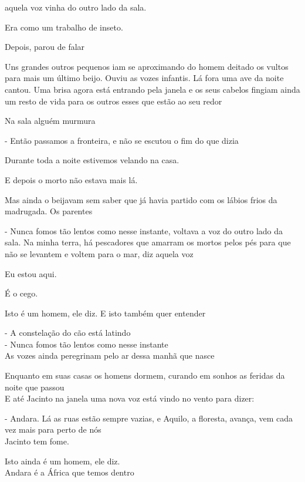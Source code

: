 aquela voz vinha do outro lado da sala.

Era como um trabalho de inseto.

Depois, parou de falar

Uns grandes outros pequenos iam se aproximando do homem deitado os
vultos para mais um último beijo. Ouviu as vozes infantis. Lá fora uma
ave da noite cantou. Uma brisa agora está entrando pela janela e os seus
cabelos fingiam ainda um resto de vida para os outros esses que estão ao
seu redor

Na sala alguém murmura

- Então passamos a fronteira, e não se escutou o fim do que dizia

Durante toda a noite estivemos velando na casa.

E depois o morto não estava mais lá.

Mas ainda o beijavam sem saber que já havia partido com os lábios frios
da madrugada. Os parentes

- Nunca fomos tão lentos como nesse instante, voltava a voz do outro
lado da sala. Na minha terra, há pescadores que amarram os mortos pelos
pés para que não se levantem e voltem para o mar, diz aquela voz

\pagebreak

Eu estou aqui.

É o cego.

Isto é um homem, ele diz. E isto também quer entender

\pagebreak

- A constelação do cão está latindo\\

- Nunca fomos tão lentos como nesse instante\\

As vozes ainda peregrinam pelo ar dessa manhã que nasce

Enquanto em suas casas os homens dormem, curando em sonhos as feridas da
noite que passou\\

E até Jacinto na janela uma nova voz está vindo no vento para dizer:

- Andara. Lá as ruas estão sempre vazias, e Aquilo, a floresta, avança,
vem cada vez mais para perto de nós\\

Jacinto tem fome.

Isto ainda é um homem, ele diz.\\

Andara é a África que temos dentro

